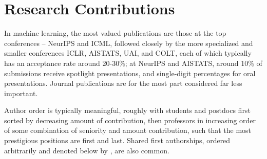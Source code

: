 \documentclass[12pt]{article}
\newcommand{\bibeqcon}{{\footnotemark[1]}}
\begin{document}
\section{Research Contributions}
\renewcommand{\bibeqcon}{{\footnotemark[1]}}
\renewcommand{\thefootnote}{\fnsymbol{footnote}}  %
In machine learning, the most valued publications are those at the top conferences -- NeurIPS and ICML, followed closely by the more specialized and smaller conferences ICLR, AISTATS, UAI, and COLT, each of which typically has an acceptance rate around 20-30\%; at NeurIPS and AISTATS, around 10\% of submissions receive spotlight presentations, and single-digit percentages for oral presentations.
Journal publications are for the most part considered far less important.
\nocite{*}

Author order is typically meaningful,
roughly with students and postdocs first sorted by decreasing amount of contribution,
then professors in increasing order of some combination of seniority and amount contribution,
such that the most prestigious positions are first and last.
Shared first authorships, ordered arbitrarily and denoted below by \bibeqcon{}, are also common.
\end{document}
